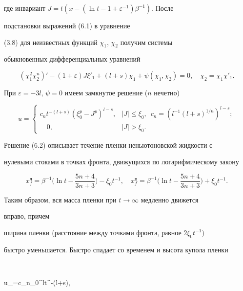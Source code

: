 где инвариант $J=t(x-(\ln t-1+\varepsilon^{-1})\beta^{-1})$. После


подстановки выражений (6.1) в уравнение


(3.8) для неизвестных функций $\chi_1$, $\chi_2$ получим системы


обыкновенных дифференциальных уравнений


$$


(\chi^2_1\chi^n_2)'-(1+\varepsilon)J\xi'_1+(l+s)\chi_1+


\psi(\chi_1,\chi_2)=0,\quad \chi_2=\chi_1\chi'_1.


$$


При $\varepsilon=-3l$, $\psi=0$ имеем замкнутое решение ($n$ нечетно)


\begin{equation}


u=


\begin{cases}


c_nt^{-(l+s)}(\xi^p_0-J^p)^{l-s}, &|J|\le\xi_0,\ \;


c_n=(l^{-1}(l+s)^{1/n})^{l-s};\\


\quad 0, & |J|>\xi_0.


\end{cases}


\end{equation}


Решение (6.2) описывает течение пленки неньютоновской жидкости с


нулевыми стоками в точках фронта, движущихся по логарифмическому закону


$$


x^л_f=\beta^{-1}\biggl(\ln t-\frac{5n+4}{3n+3}\biggr)


-\xi_0t^{-1},\quad


x^п_f=\beta^{-1}\biggl(\ln t-\frac{5n+4}{3n+3}\biggr)


+\xi_0t^{-1}.


$$


Таким образом, вся масса пленки при $t\to\infty$ медленно движется


вправо, причем


ширина пленки (расстояние между точками фронта, равное $2\xi_0t^{-1}$)


быстро уменьшается. Быстро спадает со временем и высота купола пленки


$$


u_{\max}=c_n\xi_0^lt^{-(l+s)},


